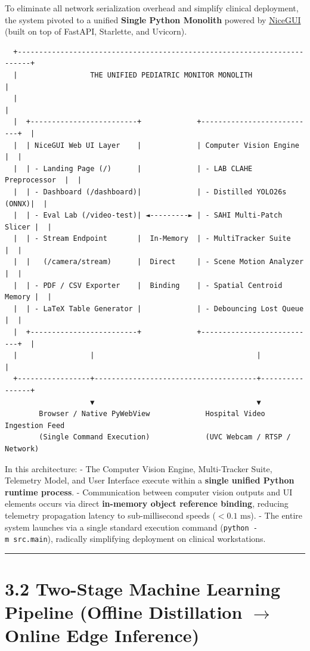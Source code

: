 To eliminate all network serialization overhead and simplify clinical
deployment, the system pivoted to a unified \textbf{Single Python
Monolith} powered by \href{https://nicegui.io/}{NiceGUI} (built on top
of FastAPI, Starlette, and Uvicorn).

\begin{verbatim}
  +-------------------------------------------------------------------------+
  |                 THE UNIFIED PEDIATRIC MONITOR MONOLITH                  |
  |                                                                         |
  |  +-------------------------+             +---------------------------+  |
  |  | NiceGUI Web UI Layer    |             | Computer Vision Engine    |  |
  |  | - Landing Page (/)      |             | - LAB CLAHE Preprocessor  |  |
  |  | - Dashboard (/dashboard)|             | - Distilled YOLO26s (ONNX)|  |
  |  | - Eval Lab (/video-test)| ◄---------► | - SAHI Multi-Patch Slicer |  |
  |  | - Stream Endpoint       |  In-Memory  | - MultiTracker Suite      |  |
  |  |   (/camera/stream)      |  Direct     | - Scene Motion Analyzer   |  |
  |  | - PDF / CSV Exporter    |  Binding    | - Spatial Centroid Memory |  |
  |  | - LaTeX Table Generator |             | - Debouncing Lost Queue   |  |
  |  +-------------------------+             +---------------------------+  |
  |                 |                                      |                |
  +-----------------+--------------------------------------+----------------+
                    ▼                                      ▼
        Browser / Native PyWebView             Hospital Video Ingestion Feed
        (Single Command Execution)             (UVC Webcam / RTSP / Network)
\end{verbatim}

In this architecture: - The Computer Vision Engine, Multi-Tracker Suite,
Telemetry Model, and User Interface execute within a \textbf{single
unified Python runtime process}. - Communication between computer vision
outputs and UI elements occurs via direct \textbf{in-memory object
reference binding}, reducing telemetry propagation latency to
sub-millisecond speeds (\(<0.1\text{ ms}\)). - The entire system
launches via a single standard execution command
(\texttt{python\ -m\ src.main}), radically simplifying deployment on
clinical workstations.

\begin{center}\rule{0.5\linewidth}{0.5pt}\end{center}

\section{\texorpdfstring{3.2 Two-Stage Machine Learning Pipeline
(Offline Distillation \(\to\) Online Edge
Inference)}{3.2 Two-Stage Machine Learning Pipeline (Offline Distillation \textbackslash to Online Edge Inference)}}\label{two-stage-machine-learning-pipeline-offline-distillation-to-online-edge-inference}

